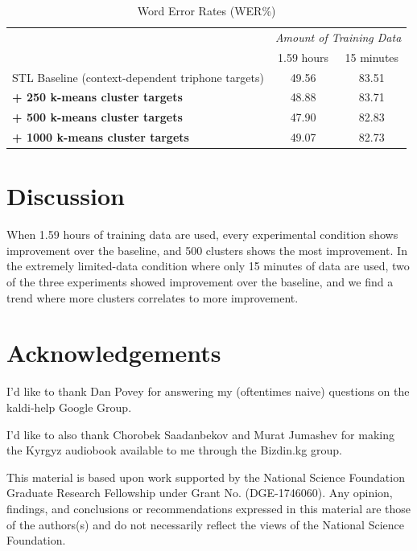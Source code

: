 \documentclass[a4paper]{article}
\begin{document}
\begin{table}[!htbp]
  \centering
  \caption{Word Error Rates (WER\%)}
    \label{tab:results}
  \begin{adjustbox}{width=.4\textwidth}
    \begin{tabular}{lcc}
      \toprule
      & \multicolumn{2}{c}{ \textit{Amount of Training Data}}\\
      & 1.59 hours & 15 minutes \\
      \midrule
      STL Baseline (context-dependent triphone targets)                            & 49.56       &  83.51 \\
      \textbf{+ 250 k-means cluster targets}        & 48.88            & 83.71 \\
      \textbf{+ 500 k-means cluster targets}        & 47.90       & 82.83 \\
      \textbf{+ 1000 k-means cluster targets}        & 49.07       & 82.73 \\
      \midrule
      \bottomrule
    \end{tabular}
  \end{adjustbox}
\end{table}




\section{Discussion}


When 1.59 hours of training data are used, every experimental condition shows improvement over the baseline, and 500 clusters shows the most improvement. In the extremely limited-data condition where only 15 minutes of data are used, two of the three experiments showed improvement over the baseline, and we find a trend where more clusters correlates to more improvement.








\section{Acknowledgements}

I'd like to thank Dan Povey for answering my (oftentimes naive) questions on the kaldi-help Google Group.

I'd like to also thank Chorobek Saadanbekov and Murat Jumashev for making the Kyrgyz audiobook available to me through the Bizdin.kg group.

This material is based upon work supported by the National Science Foundation Graduate Research Fellowship under Grant No. (DGE-1746060). Any opinion, findings, and conclusions or recommendations expressed in this material are those of the authors(s) and do not necessarily reflect the views of the National Science Foundation.





\newpage



\end{document}
